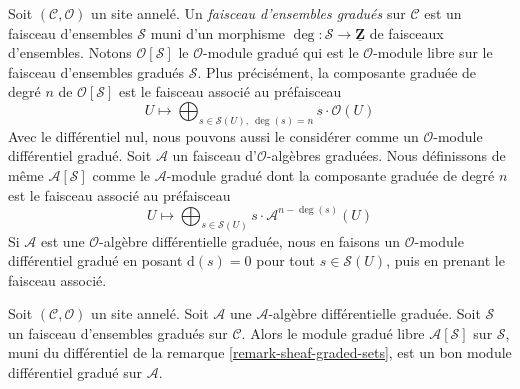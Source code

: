 \begin{remark}
\label{remark-sheaf-graded-sets}
Soit $(\mathcal{C}, \mathcal{O})$ un site annelé. Un
{\it faisceau d'ensembles gradués} sur $\mathcal{C}$ est un faisceau
d'ensembles $\mathcal{S}$ muni d'un morphisme
$\deg : \mathcal{S} \to \underline{\mathbf{Z}}$
de faisceaux d'ensembles. Notons $\mathcal{O}[\mathcal{S}]$
le $\mathcal{O}$-module gradué qui est le
$\mathcal{O}$-module libre sur le faisceau d'ensembles gradués $\mathcal{S}$.
Plus précisément, la composante graduée de degré $n$ de
$\mathcal{O}[\mathcal{S}]$ est le faisceau associé au préfaisceau
$$
U \longmapsto
\bigoplus\nolimits_{s \in \mathcal{S}(U),\ \deg(s) = n} s \cdot \mathcal{O}(U)
$$
Avec le différentiel nul, nous pouvons aussi le considérer comme un
$\mathcal{O}$-module différentiel gradué.
Soit $\mathcal{A}$ un faisceau d'$\mathcal{O}$-algèbres graduées.
Nous définissons de même $\mathcal{A}[\mathcal{S}]$ comme le
$\mathcal{A}$-module gradué dont la composante graduée de degré $n$ est le
faisceau associé au préfaisceau
$$
U \longmapsto
\bigoplus\nolimits_{s \in \mathcal{S}(U)} s \cdot \mathcal{A}^{n - \deg(s)}(U)
$$
Si $\mathcal{A}$ est une $\mathcal{O}$-algèbre différentielle graduée,
nous en faisons un $\mathcal{O}$-module différentiel gradué
en posant $\text{d}(s) = 0$ pour tout $s \in \mathcal{S}(U)$,
puis en prenant le faisceau associé.
\end{remark}

\begin{lemma}
\label{lemma-free-graded-module-good}
Soit $(\mathcal{C}, \mathcal{O})$ un site annelé. Soit
$\mathcal{A}$ une $\mathcal{A}$-algèbre différentielle graduée. Soit
$\mathcal{S}$ un faisceau d'ensembles gradués sur $\mathcal{C}$.
Alors le module gradué libre $\mathcal{A}[\mathcal{S}]$
sur $\mathcal{S}$, muni du différentiel de la remarque
\ref{remark-sheaf-graded-sets}, est
un bon module différentiel gradué sur $\mathcal{A}$.
\end{lemma}

